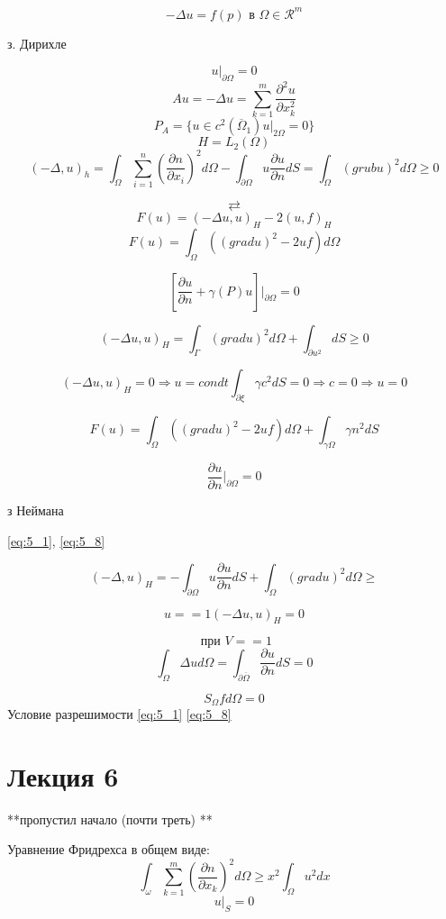 \documentclass[12pt, a4paper]{article}
\begin{document}
\[ -\Delta u = f(p) \textrm{ в } \Omega \in \mathcal{R}^m \]\label{eq:5_1}

з. Дирихле

\[ u|_{\partial \Omega} = 0 \]\label{eq:5_2}
\[ A u = - \Delta u = \sum_{k=1}^{m } \frac{\partial^2 u }{\partial x_k^2} \]
\[ P_A = \{ u \in c^2 (\overline{\Omega}_1) u |_{2 \Omega} = 0 \} \]
\[ H = L_2 (\Omega) \]
\[ (- \Delta, u )_h = \int_{\Omega}^{} \sum_{i=1}^{n} (\frac{\partial n }{\partial x_i})^2 d \Omega - \int_{ \partial \Omega}^{} u \frac{\partial u }{\partial n } dS = \int_{\Omega}^{} {({grub} u)}^2 d\Omega \geq 0 \]\label{eq:5_3}

\[  \rightleftarrows \]
\[ F(u) = (-\Delta u, u )_H -2(u, f)_H  \]\label{eq:5_4}
\[ F(u) = \int_{\Omega }^{} ((grad u )^2 - 2uf) d\Omega  \]\label{eq:5_5}

\[ [\frac{\partial u }{\partial n} + \gamma (P) u ] |_{\partial \Omega} = 0 \]\label{eq:5_6}

\[ (- \Delta u, u)_H = \int_{\Gamma}^{} (grad u)^2 d\Omega + \int_{\partial u^2}^{} dS \geq 0 \]

\[ (-\Delta u, u)_H =0 \Rightarrow u = condt \int_{ \partial \xi}^{} \gamma c^2 dS = 0 \Rightarrow c = 0 \Rightarrow u= 0\]

\[ F(u) = \int_{\Omega}^{} ((grad u)^2 - 2uf) d\Omega + \int_{\gamma \Omega} \gamma n^2 dS \]\label{eq:5_7}

\[ \frac{\partial u }{\partial n}|_{\partial \Omega } = 0 \]\label{eq:5_8}

з Неймана

\ref{eq:5_1}, \ref{eq:5_8}

\[ (- \Delta, u )_H = - \int_{\partial \Omega}^{} u  \frac{\partial u}{\partial n} dS + \int_{\Omega}^{} (grad u )^2 d\Omega \geq \]

\[ u == 1 (- \Delta u, u)_H = 0 \]

\[ \textrm{ при  } V == 1 \]
\[ \int_{\Omega }^{} \Delta u d\Omega = \int_{\partial \overline{\Omega}}^{} \frac{\partial u }{\partial n } dS = 0 \]

\[ S_{\Omega} f d \Omega = 0\]
Условие разрешимости \ref{eq:5_1} \ref{eq:5_8}

\section{Лекция 6}

**пропустил начало (почти треть) **

Уравнение Фридрехса в общем виде:
\[ \int_{\omega}^{} \sum_{k=1}^{m} (\frac{\partial  n}{\partial x_k})^2 d\Omega \geq x^2 \int_{\Omega}^{} u^2 dx \]
\[ u|_S=0 \]
\end{document}
